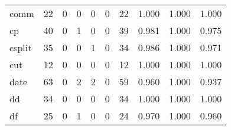 \begin{longtable}{lp{2.0cm}p{2.0cm}p{2.0cm}p{2.0cm}p{2.0cm}p{2.0cm}p{2.0cm}p{2.0cm}p{2.0cm}}
comm      &                     22 &                                             0 &                                            0 &                                           0 &                                            0 &                                         22 &                                1.000 &                                  1.000 &                                1.000 \\
cp        &                     40 &                                             0 &                                            1 &                                           0 &                                            0 &                                         39 &                                0.981 &                                  1.000 &                                0.975 \\
csplit    &                     35 &                                             0 &                                            0 &                                           1 &                                            0 &                                         34 &                                0.986 &                                  1.000 &                                0.971 \\
cut       &                     12 &                                             0 &                                            0 &                                           0 &                                            0 &                                         12 &                                1.000 &                                  1.000 &                                1.000 \\
date      &                     63 &                                             0 &                                            2 &                                           2 &                                            0 &                                         59 &                                0.960 &                                  1.000 &                                0.937 \\
dd        &                     34 &                                             0 &                                            0 &                                           0 &                                            0 &                                         34 &                                1.000 &                                  1.000 &                                1.000 \\
df        &                     25 &                                             0 &                                            1 &                                           0 &                                            0 &                                         24 &                                0.970 &                                  1.000 &                                0.960 \\

\end{longtable}
